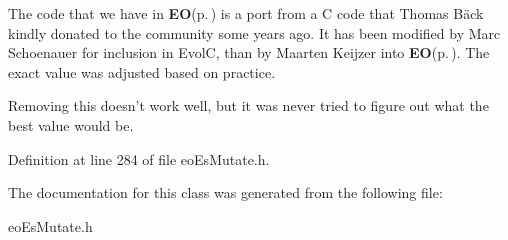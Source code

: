 The code that we have in {\bf EO}{\rm (p.\,\pageref{class_e_o})} is a port from a C code that Thomas B\"{a}ck kindly donated to the community some years ago. It has been modified by Marc Schoenauer for inclusion in Evol\-C, than by Maarten Keijzer into {\bf EO}{\rm (p.\,\pageref{class_e_o})}. The exact value was adjusted based on practice.

Removing this doesn't work well, but it was never tried to figure out what the best value would be. 

Definition at line 284 of file eo\-Es\-Mutate.h.

The documentation for this class was generated from the following file:\begin{CompactItemize}
\item 
eo\-Es\-Mutate.h\end{CompactItemize}
